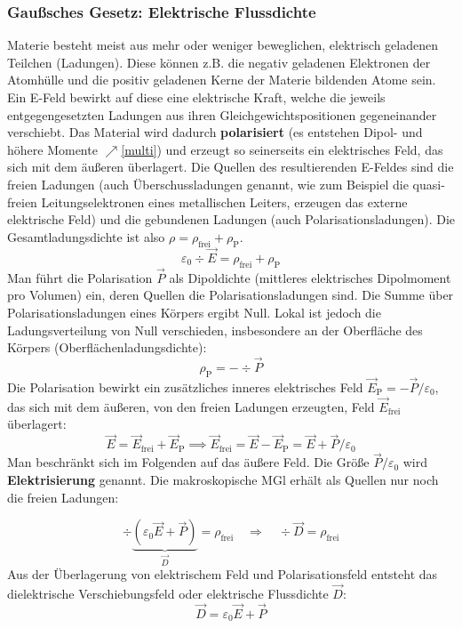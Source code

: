 \subsubsection{Gaußsches Gesetz: Elektrische Flussdichte}\label{gausmat}
 Materie besteht meist aus mehr oder weniger beweglichen, elektrisch geladenen Teilchen (Ladungen). Diese können z.B. die negativ geladenen Elektronen der Atomhülle und die positiv geladenen Kerne der Materie bildenden Atome sein.
 Ein E-Feld bewirkt auf diese eine elektrische Kraft, welche die jeweils entgegengesetzten Ladungen aus ihren Gleichgewichtspositionen gegeneinander verschiebt. Das Material wird dadurch \textbf{polarisiert} (es entstehen Dipol- und höhere Momente $\nearrow$\ref{multi}) und erzeugt so seinerseits ein elektrisches Feld, das sich mit dem äußeren überlagert. Die Quellen des resultierenden E-Feldes sind die freien Ladungen (auch Überschussladungen genannt, wie zum Beispiel die quasi-freien Leitungselektronen eines metallischen Leiters, erzeugen das externe elektrische Feld) und die gebundenen Ladungen (auch Polarisationsladungen). Die Gesamtladungsdichte ist also $\rho=\rho_{\text{frei}}+\rho_{\text{P}}$.
 \begin{equation}\varepsilon_0\div \vec{E}=\rho_{\text{frei}}+\rho_{\text{P}}\end{equation}
 Man führt die Polarisation $\vec{P}$ als Dipoldichte (mittleres elektrisches Dipolmoment pro Volumen) ein, deren Quellen die Polarisationsladungen sind. Die Summe über Polarisationsladungen eines Körpers ergibt Null. Lokal ist jedoch die Ladungsverteilung von Null verschieden, insbesondere an der Oberfläche des Körpers (Oberflächenladungsdichte):
 \begin{equation}\rho_{\text{P}}=-\div \vec{P}\end{equation}
 Die Polarisation bewirkt ein zusätzliches inneres elektrisches Feld $\vec{E}_{\text{P}}=-\vec{P}/\varepsilon_0$, das sich mit dem äußeren, von den freien Ladungen erzeugten, Feld $\vec{E}_{\text{frei}}$ überlagert: 
 \begin{equation}
 \vec{E}=\vec{E}_{\text{frei}}+\vec{E}_{\text{P}}\implies\vec{E}_{\text{frei}}=\vec{E}-\vec{E}_{\text{P}}=\vec{E}+\vec{P}/\varepsilon_0
 	\end{equation} 
 	Man beschränkt sich im Folgenden auf das äußere Feld. Die Größe $\vec P/\varepsilon_0$ wird \textbf{Elektrisierung} genannt. Die makroskopische MGl erhält als Quellen nur noch die freien Ladungen:
 
\begin{equation}\div \underbrace{\left( \varepsilon_0\vec{E}+\vec{P} \right)}_{{\vec{D}}}=\rho_{\text{frei}}\quad\Rightarrow\quad\div \vec{D}=\rho_{\text{frei}}\end{equation}
 Aus der Überlagerung von elektrischem Feld und Polarisationsfeld entsteht das dielektrische Verschiebungsfeld oder elektrische Flussdichte $\vec D$:
 \begin{equation}\vec D=\varepsilon_0 \vec E + \vec P\end{equation}
